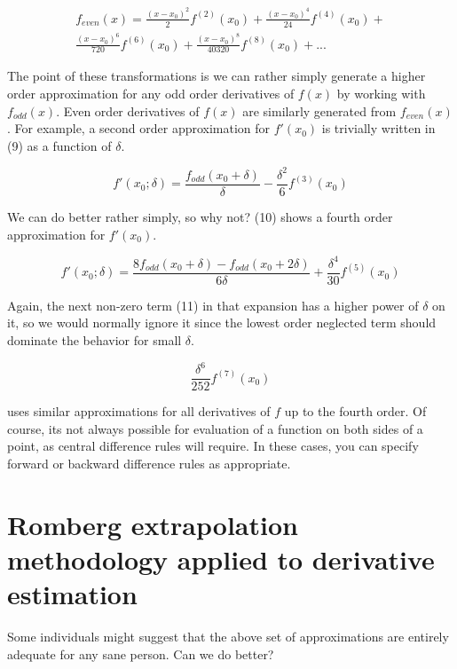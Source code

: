\documentclass[a4paper,11pt]{article}
\begin{document}
\begin{multline} \tag{8}
f_{even}(x) = \frac{(x - x_0)^2}{2} f^{(2)}(x_0) + \frac{(x - x_0)^4}{24} f^{(4)}(x_0) + \\
 \frac{(x - x_0)^6}{720} f^{(6)}(x_0) + \frac{(x - x_0)^8}{40320} f^{(8)}(x_0) + ...
\end{multline}

The point of these transformations is we can rather simply generate a higher order approximation
for any odd order derivatives of $f(x)$ by working with $f_{odd}(x)$. Even order derivatives of $f(x)$ are similarly generated from $f_{even}(x)$. For example, a second order approximation for $f'(x_0)$ is trivially written in (9) as a function of $\delta$.

\begin{equation} \tag{9}
   f'(x_0; \delta) = \frac{f_{odd}(x_0 + \delta)}{\delta} - \frac{\delta^2}{6} f^{(3)}(x_0)
\end{equation}

We can do better rather simply, so why not? (10) shows a fourth order approximation for $f'(x_0)$.

\begin{equation} \tag{10}
   f'(x_0; \delta) = \frac{8 f_{odd}(x_0+\delta)-f_{odd}(x_0+2\delta)}{6\delta} + \frac{\delta^4}{30} f^{(5)}(x_0)
\end{equation}

Again, the next non-zero term (11) in that expansion has a higher power of $\delta$ on it, so we
would normally ignore it since the lowest order neglected term should dominate the behavior
for small $\delta$.

\begin{equation} \tag{11}
  \frac{\delta^6}{252} f^{(7)}(x_0)
\end{equation}

 uses similar approximations for all derivatives of $f$ up to the fourth order.
Of course, its not always possible for evaluation of a function on both sides of a point, as central difference rules will require. In these cases, you can specify forward or backward difference rules
as appropriate.


\bigskip

\section{Romberg extrapolation methodology applied to derivative estimation}

Some individuals might suggest that the above set of approximations are entirely adequate for
any sane person. Can we do better?
\end{document}

